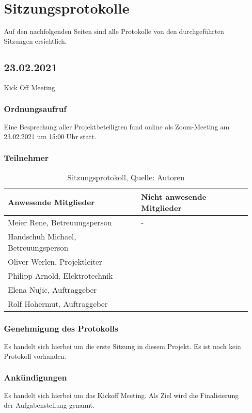 \section{Sitzungsprotokolle}
Auf den nachfolgenden Seiten sind alle Protokolle von den durchgeführten Sitzungen ersichtlich.

\subsection{23.02.2021}
Kick Off Meeting
\subsubsection{Ordnungsaufruf}
Eine Besprechung aller Projektbeteiligten fand online als Zoom-Meeting am 23.02.2021 um 15:00 Uhr statt.
\subsubsection{Teilnehmer}
\begin{table}[H]
	\setlength\extrarowheight{2pt} %
	\begin{tabularx}{\textwidth}{|X|X|}
		\hline
		\textbf{Anwesende Mitglieder} &  \textbf{Nicht anwesende Mitglieder} \\
		\hline
		Meier Rene, Betreuungsperson &  -\\
		Handschuh Michael, Betreuungsperson &  \\
		Oliver Werlen, Projektleiter &  \\
		Philipp Arnold, Elektrotechnik & \\
		Elena Nujic, Auftraggeber & \\
		Rolf Hohermut, Auftraggeber &\\
		\hline
	\end{tabularx}
	\caption{ \label{tbl: Teilnehmerliste vom 23.02.2021}Sitzungsprotokoll, Quelle: Autoren}
\end{table}
\subsubsection{Genehmigung des Protokolls}
Es handelt sich hierbei um die erste Sitzung in diesem Projekt. Es ist noch kein Protokoll vorhanden. 
\subsubsection{Ankündigungen}
Es handelt sich hierbei um das Kickoff Meeting. Als Ziel wird die Finalisierung der Aufgabenstellung genannt. 
